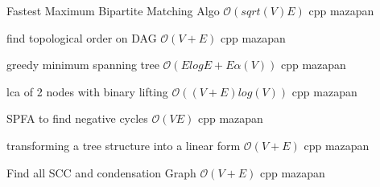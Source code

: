 {Fastest Maximum Bipartite Matching Algo}
{$\mathcal{O}(sqrt(V)E)$}
{cpp}{}
{mazapan}

{find topological order on DAG}
{$\mathcal{O}(V + E)$}
{cpp}{}
{mazapan}

{greedy minimum spanning tree}
{$\mathcal{O}(ElogE+E\alpha(V))$}
{cpp}{}
{mazapan}

{lca of 2 nodes with binary lifting}
{$\mathcal{O}((V + E)log(V))$}
{cpp}{}
{mazapan}

{SPFA to find negative cycles}
{$\mathcal{O}(VE)$}
{cpp}{}
{mazapan}

{transforming a tree structure into a linear form}
{$\mathcal{O}(V + E)$}
{cpp}{}
{mazapan}

{Find all SCC and condensation Graph}
{$\mathcal{O}(V + E)$}
{cpp}{}
{mazapan}